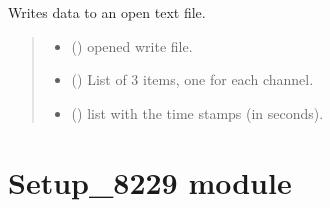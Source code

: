 \documentclass[letterpaper,10pt,english]{sphinxmanual}
\begin{document}
\begin{fulllineitems}
\begin{fulllineitems}
\label{\detokenize{Setup_8206HR:Setup_8206HR.Setup_8206HR._WriteDataToFile_TXT}}
\pysigstartsignatures
{}
\pysigstopsignatures
\sphinxAtStartPar
Writes data to an open text file.
\begin{quote}\begin{description}
\begin{itemize}
\item {} 
\sphinxAtStartPar
{} () \textendash{} opened write file.

\item {} 
\sphinxAtStartPar
{} (\sphinxstyleliteralemphasis{\sphinxupquote{{[}}}\sphinxstyleliteralemphasis{\sphinxupquote{{]}}}) \textendash{} List of 3 items, one for each channel.

\item {} 
\sphinxAtStartPar
{} () \textendash{} list with the time stamps (in seconds).

\end{itemize}

\end{description}\end{quote}

\end{fulllineitems}


\end{fulllineitems}


\sphinxstepscope


\section{Setup\_8229 module}
\label{\detokenize{Setup_8229:module-Setup_8229}}\label{\detokenize{Setup_8229:setup-8229-module}}\label{\detokenize{Setup_8229::doc}}
\end{document}
